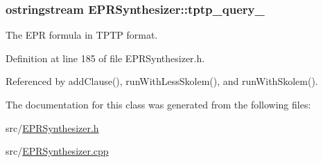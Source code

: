 \hypertarget{classEPRSynthesizer_a5b9074e1ca3d1a12150c6ae639f475fa}{
\subsubsection[{tptp\-\_\-query\-\_\-}]{\setlength{\rightskip}{0pt plus 5cm}ostringstream E\-P\-R\-Synthesizer\-::tptp\-\_\-query\-\_\-\hspace{0.3cm}{\ttfamily [protected]}}}\label{classEPRSynthesizer_a5b9074e1ca3d1a12150c6ae639f475fa}


The E\-P\-R formula in T\-P\-T\-P format. 



Definition at line 185 of file E\-P\-R\-Synthesizer.\-h.



Referenced by add\-Clause(), run\-With\-Less\-Skolem(), and run\-With\-Skolem().



The documentation for this class was generated from the following files\-:\begin{DoxyCompactItemize}
\item 
src/\hyperlink{EPRSynthesizer_8h}{E\-P\-R\-Synthesizer.\-h}\item 
src/\hyperlink{EPRSynthesizer_8cpp}{E\-P\-R\-Synthesizer.\-cpp}\end{DoxyCompactItemize}
